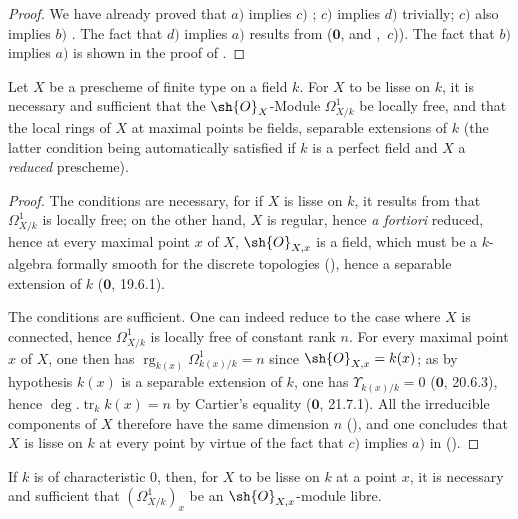 \begin{proof}
We have already proved that $a)$ implies $c)$ ; $c)$ implies $d)$ trivially; $c)$ also implies $b)$ .
The fact that $d)$ implies $a)$ results from ($\mathbf{0}$,  and ,~$c$)).
The fact that $b)$ implies $a)$ is shown in the proof of .
\end{proof}


\begin{corollary}[17.15.6]
\label{IV.17.15.6}
Let $X$ be a prescheme of finite type on a field $k$.
For $X$ to be lisse on $k$, it is necessary and sufficient that the $\sh{O}_X$-Module $\Omega^1_{X/k}$ be locally free, and that the local rings of $X$ at maximal points be fields, separable extensions of $k$ (the latter condition being automatically satisfied if $k$ is a perfect field and $X$ a \emph{reduced} prescheme).
\end{corollary}

\begin{proof}
The conditions are necessary, for if $X$ is lisse on $k$, it results from  that $\Omega^1_{X/k}$ is locally free; on the other hand, $X$ is regular, hence \emph{a fortiori} reduced, hence at every maximal point $x$ of $X$, $\sh{O}_{X,x}$ is a field, which must be a $k$-algebra formally smooth for the discrete topologies (), hence a separable extension of $k$ ($\mathbf{0}$, 19.6.1).

The conditions are sufficient.
One can indeed reduce to the case where $X$ is connected, hence $\Omega^1_{X/k}$ is locally free of constant rank $n$.
For every maximal point $x$ of $X$, one then has $\operatorname{rg}_{k(x)}\Omega^1_{k(x)/k}=n$ since $\sh{O}_{X,x}=k(x)$; as by hypothesis $k(x)$ is a separable extension of $k$, one has $\Upsilon_{k(x)/k}=0$ ($\mathbf{0}$, 20.6.3), hence $\deg.\operatorname{tr}_k k(x)=n$ by Cartier's equality ($\mathbf{0}$, 21.7.1).
All the irreducible components of $X$ therefore have the same dimension $n$ (), and one concludes that $X$ is lisse on $k$ at every point by virtue of the fact that $c)$ implies $a)$ in ().
\end{proof}

\begin{corollary}[17.15.7]
\label{IV.17.15.7}
If $k$ is of characteristic $0$, then, for $X$ to be lisse on $k$ at a point $x$, it is necessary and sufficient that $(\Omega^1_{X/k})_x$ be an $\sh{O}_{X,x}$-module libre.
\end{corollary}

